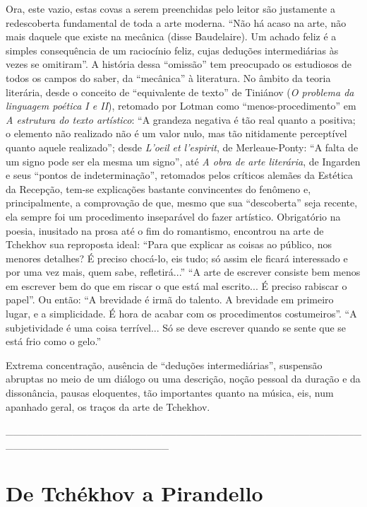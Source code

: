 Ora, este vazio, estas covas a serem preenchidas pelo leitor são
justamente a redescoberta fundamental de toda a arte moderna. ``Não há
acaso na arte, não mais daquele que existe na mecânica (disse
Baudelaire). Um achado feliz é a simples consequência de um raciocínio
feliz, cujas deduções intermediárias às vezes se omitiram''. A história
dessa ``omissão'' tem preocupado os estudiosos de todos os campos do
saber, da ``mecânica'' à literatura. No âmbito da teoria literária,
desde o conceito de ``equivalente de texto'' de Tiniánov (\emph{O
problema da linguagem poética I e II}), retomado por Lotman como
``menos-procedimento'' em \emph{A estrutura do texto artístico}: ``A
grandeza negativa é tão real quanto a positiva; o elemento não realizado
não é um valor nulo, mas tão nitidamente perceptível quanto aquele
realizado''; desde \emph{L'oeil et l'espirit}, de Merleaue-Ponty: ``A
falta de um signo pode ser ela mesma um signo'', até \emph{A obra de
arte literária}, de Ingarden e seus ``pontos de indeterminação'',
retomados pelos críticos alemães da Estética da Recepção, tem-se
explicações bastante convincentes do fenômeno e, principalmente, a
comprovação de que, mesmo que sua ``descoberta'' seja recente, ela
sempre foi um procedimento inseparável do fazer artístico. Obrigatório
na poesia, inusitado na prosa até o fim do romantismo, encontrou na arte
de Tchekhov sua reproposta ideal: ``Para que explicar as coisas ao
público, nos menores detalhes? É preciso chocá-lo, eis tudo; só assim
ele ficará interessado e por uma vez mais, quem sabe, refletirá...'' ``A
arte de escrever consiste bem menos em escrever bem do que em riscar o
que está mal escrito... É preciso rabiscar o papel''. Ou então: ``A
brevidade é irmã do talento. A brevidade em primeiro lugar, e a
simplicidade. É hora de acabar com os procedimentos costumeiros''. ``A
subjetividade é uma coisa terrível... Só se deve escrever quando se
sente que se está frio como o gelo.''

Extrema concentração, ausência de ``deduções intermediárias'', suspensão
abruptas no meio de um diálogo ou uma descrição, noção pessoal da
duração e da dissonância, pausas eloquentes, tão importantes quanto na
música, eis, num apanhado geral, os traços da arte de Tchekhov.

\_\_\_\_\_\_\_\_\_\_\_\_\_\_\_\_\_\_\_\_\_\_\_\_\_\_\_\_\_\_\_\_\_\_\_\_\_\_\_\_\_\_\_\_\_\_\_\_\_\_\_\_\_\_\_\_\_\_\_\_\_\_\_\_\_\_\_\_\_\_

\chapter{De Tchékhov a Pirandello}

